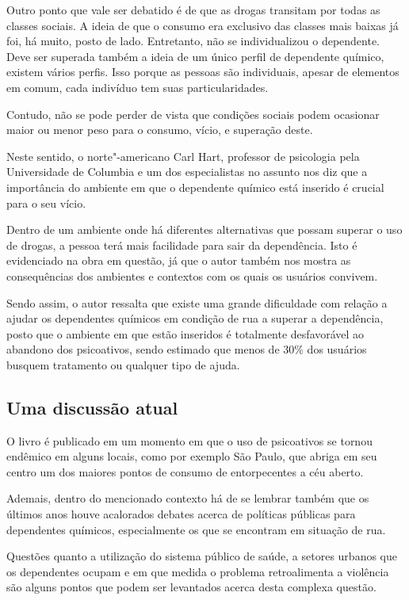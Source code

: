 \documentclass{article}
\begin{document}
Outro ponto que vale ser debatido é de que as drogas transitam por todas
as classes sociais. A ideia de que o consumo era exclusivo das classes
mais baixas já foi, há muito, posto de lado. Entretanto, não se
individualizou o dependente. Deve ser superada também a ideia de um
único perfil de dependente químico, existem vários perfis. Isso porque
as pessoas são individuais, apesar de elementos em comum, cada indivíduo
tem suas particularidades.

Contudo, não se pode perder de vista que condições sociais podem
ocasionar maior ou menor peso para o consumo, vício, e superação deste.

Neste sentido, o norte"-americano Carl Hart, professor de psicologia pela
Universidade de Columbia e um dos especialistas no assunto nos diz que a
importância do ambiente em que o dependente químico está inserido é
crucial para o seu vício.

Dentro de um ambiente onde há diferentes alternativas que possam superar
o uso de drogas, a pessoa terá mais facilidade para sair da dependência.
Isto é evidenciado na obra em questão, já que o autor também nos mostra
as consequências dos ambientes e contextos com os quais os usuários
convivem.

Sendo assim, o autor ressalta que existe uma grande dificuldade com
relação a ajudar os dependentes químicos em condição de rua a superar a
dependência, posto que o ambiente em que estão inseridos é totalmente
desfavorável ao abandono dos psicoativos, sendo estimado que menos de
30\% dos usuários busquem tratamento ou qualquer tipo de ajuda.

\subsection{Uma discussão atual}

O livro é publicado em um momento em que o uso de psicoativos se tornou
endêmico em alguns locais, como por exemplo São Paulo, que abriga em seu
centro um dos maiores pontos de consumo de entorpecentes a céu aberto.

Ademais, dentro do mencionado contexto há de se lembrar também que os
últimos anos houve acalorados debates acerca de políticas públicas para
dependentes químicos, especialmente os que se encontram em situação de
rua.

Questões quanto a utilização do sistema público de saúde, a setores
urbanos que os dependentes ocupam e em que medida o problema
retroalimenta a violência são alguns pontos que podem ser levantados
acerca desta complexa questão.
\end{document}
